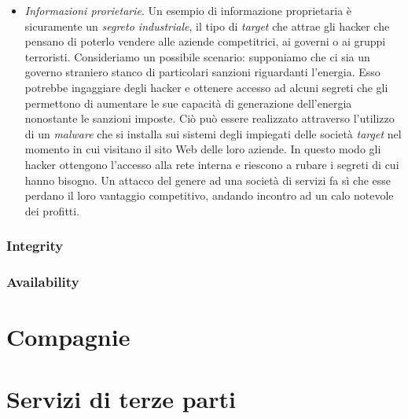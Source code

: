 \begin{itemize}
\begin{itemize}
	\end{itemize}
\item \textit{Informazioni prorietarie}. Un esempio di informazione proprietaria è sicuramente un \textit{segreto industriale}, il tipo di \textit{target} che attrae gli hacker che pensano di poterlo vendere alle aziende competitrici, ai governi o ai gruppi terroristi. \newline Consideriamo un possibile scenario: supponiamo che ci sia un governo straniero stanco di particolari sanzioni riguardanti l'energia. Esso potrebbe ingaggiare degli hacker e ottenere accesso ad alcuni segreti che gli permettono  di aumentare le sue capacità di generazione dell'energia nonostante le sanzioni imposte. Ciò può essere realizzato attraverso l'utilizzo di un \textit{malware} che si installa sui sistemi degli impiegati delle società \textit{target} nel momento in cui visitano il sito Web delle loro aziende. In questo modo gli hacker ottengono l'accesso alla rete interna e riescono a rubare i segreti di cui hanno bisogno. Un attacco del genere ad una società di servizi fa sì che esse perdano il loro vantaggio competitivo, andando incontro ad un calo notevole dei profitti.
\end{itemize}

\subsubsection{Integrity}

\subsubsection{Availability}

\section{Compagnie}

\section{Servizi di terze parti}

